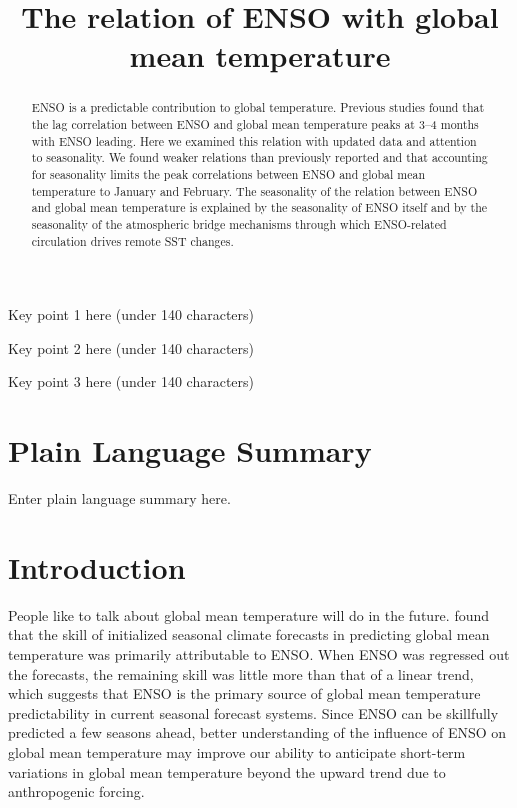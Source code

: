 \documentclass[draft]{agujournal2019}
\begin{document}
\title{The relation of ENSO with global mean temperature}




\begin{keypoints}
\item Key point 1 here (under 140 characters)
\item Key point 2 here (under 140 characters)
\item Key point 3 here (under 140 characters)
\end{keypoints}

\begin{abstract}
ENSO is a predictable contribution to global temperature. Previous studies found that the lag correlation between ENSO and global mean temperature peaks at 3--4 months with ENSO leading. Here we examined this relation with updated data and attention to seasonality. We found weaker relations than previously reported and that accounting for seasonality limits the peak correlations between ENSO and global mean temperature to January and February. The seasonality of the relation between ENSO and global mean temperature is explained by the seasonality of ENSO itself and by the seasonality of the atmospheric bridge mechanisms through which ENSO-related circulation drives remote SST changes.
\end{abstract}

\section*{Plain Language Summary}
Enter plain language summary here.

\section{Introduction}

People like to talk about global mean temperature will do in the future.  found that the skill of initialized seasonal climate forecasts in predicting global mean temperature was primarily attributable to ENSO. When ENSO was regressed out the forecasts, the remaining skill was little more than that of a linear trend, which suggests that ENSO is the primary source of global mean temperature predictability in current seasonal forecast systems. Since ENSO can be skillfully predicted a few seasons ahead, better understanding of the influence of ENSO on global mean temperature may improve our ability to anticipate short-term variations in global mean temperature beyond the upward trend due to anthropogenic forcing.
\end{document}
